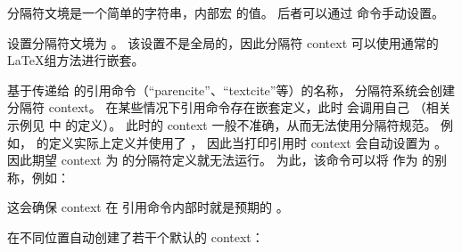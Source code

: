 \begin{ltxsyntax}
分隔符文境是一个简单的字符串，内部宏  的值。
后者可以通过  命令手动设置。



设置分隔符文境为 。
该设置不是全局的，因此分隔符 context 可以使用通常的 \LaTeX 组方法进行嵌套。



基于传递给  的引用命令（“parencite”、“textcite”等）的名称，
分隔符系统会创建分隔符 context。
在某些情况下引用命令存在嵌套定义，此时  会调用自己
（相关示例见  中  的定义）。
此时的 context 一般不准确，从而无法使用分隔符规范。
例如， 的定义实际上定义并使用了 ，
因此当打印引用时 context 会自动设置为 。
因此期望 context 为  的分隔符定义就无法运行。
为此，该命令可以将  作为  的别称，例如：

\begin{ltxexample}[style=latex]{}
\end{ltxexample}
%
这会确保 context 在  引用命令内部时就是预期的 。

\end{ltxsyntax}
%
\biblatex 在不同位置自动创建了若干个默认的 context：

